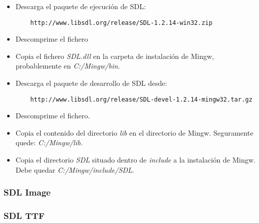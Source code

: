 \documentclass[16pt,spanish]{article}
\begin{document}
\begin{itemize}
	\item Descarga el paquete de ejecución de SDL:
	\begin{verbatim}
	http://www.libsdl.org/release/SDL-1.2.14-win32.zip
	\end{verbatim}
	\item Descomprime el fichero
	\item Copia el fichero \emph{SDL.dll} en la carpeta de instalación
	de Mingw, probablemente en \emph{C:/Mingw/bin}.
	\item Descarga el paquete de desarrollo de SDL desde:
	\begin{verbatim}
	http://www.libsdl.org/release/SDL-devel-1.2.14-mingw32.tar.gz
	\end{verbatim}
	\item Descomprime el fichero.
	\item Copia el contenido del directorio \emph{lib} en el directorio
	de Mingw. Seguramente quede: \emph{C:/Mingw/lib}.
	\item Copia el directorio \emph{SDL} situado dentro de \emph{include}
	a la instalación de Mingw. Debe quedar \emph{C:/Mingw/include/SDL}.
\end{itemize}

\subsubsection{SDL Image}

\subsubsection{SDL TTF}
\end{document}
